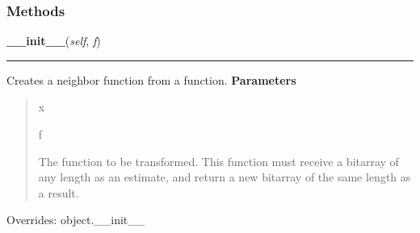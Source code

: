   \subsubsection{Methods}

    \vspace{0.5ex}

\hspace{.8\funcindent}\begin{boxedminipage}{\funcwidth}

    \raggedright \textbf{\_\_init\_\_}(\textit{self}, \textit{f})

    \vspace{-1.5ex}

    \rule{\textwidth}{0.5\fboxrule}
\setlength{\parskip}{2ex}

Creates a neighbor function from a function.
\setlength{\parskip}{1ex}
      \textbf{Parameters}
      \vspace{-1ex}

      \begin{quote}
        \begin{Ventry}{x}

          \item[f]


The function to be transformed. This function must receive a
bitarray of any length as an estimate, and return a new bitarray of
the same length as a result.
        \end{Ventry}

      \end{quote}

      Overrides: object.\_\_init\_\_

    \end{boxedminipage}

    \label{peach:sa:neighbor:BinaryNeighbor:__call__}

    \vspace{0.5ex}

